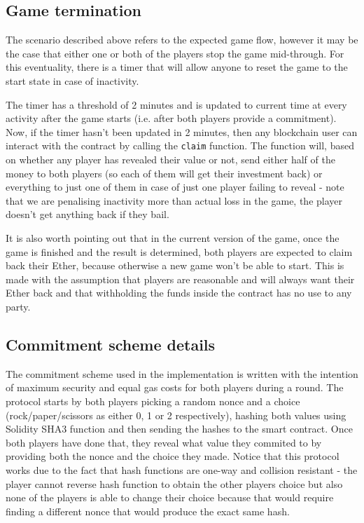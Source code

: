 \documentclass{article}
\begin{document}
    \subsection{Game termination}
    The scenario described above refers to the expected game
    flow, however it may be the case that either one or both
    of the players stop the game mid-through. For this
    eventuality, there is a timer that will allow anyone to
    reset the game to the start state in case of inactivity.
    \newline

    \noindent The timer has a threshold of 2 minutes and is
    updated to current time at every activity after the game
    starts (i.e. after both players provide a commitment).
    Now, if the timer hasn't been updated in 2 minutes, then
    any blockchain user can interact with the contract by
    calling the \verb|claim| function. The function will,
    based on whether any player has revealed their value or
    not, send either half of the money to both players (so
    each of them will get their investment back) or
    everything to just one of them in case of just one
    player failing to reveal - note that we are penalising
    inactivity more than actual loss in the game, the player
    doesn't get anything back if they bail.
    \newline

    \noindent It is also worth pointing out that in the
    current version of the game, once the game is finished
    and the result is determined, both players are expected
    to claim back their Ether, because otherwise a new game
    won't be able to start. This is made with the assumption
    that players are reasonable and will always want their
    Ether back and that withholding the funds inside the
    contract has no use to any party.

    \subsection{Commitment scheme details} \label{s:scheme}
    The commitment scheme used in the implementation is
    written with the intention of maximum security and equal
    gas costs for both players during a round. The protocol
    starts by both players picking a random nonce and a
    choice (rock/paper/scissors as either 0, 1 or 2
    respectively), hashing both values using Solidity SHA3
    function and then sending the hashes to the smart
    contract. Once both players have done that, they reveal
    what value they commited to by providing both the nonce
    and the choice they made. Notice that this protocol
    works due to the fact that hash functions are one-way
    and collision resistant - the player cannot reverse hash
    function to obtain the other players choice but also
    none of the players is able to change their choice
    because that would require finding a different nonce
    that would produce the exact same hash.
    \newline
\end{document}
